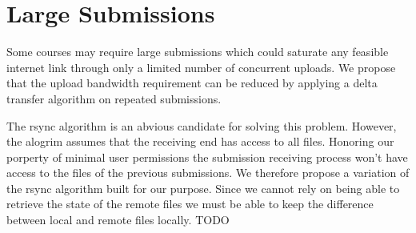 \section{Large Submissions}
Some courses may require large submissions which could saturate
any feasible internet link through only a limited number of concurrent
uploads. We propose that the upload bandwidth requirement can be
reduced by applying a delta transfer algorithm on repeated
submissions.

The rsync algorithm is an abvious candidate for solving this
problem. However, the alogrim assumes that the receiving end has
access to all files. Honoring our porperty of minimal user permissions
the submission receiving process won't have access to the files of the
previous submissions. We therefore propose a variation of the rsync
algorithm built for our purpose. Since we cannot rely on being able to
retrieve the state of the remote files we must be able to keep the
difference between local and remote files locally. TODO






